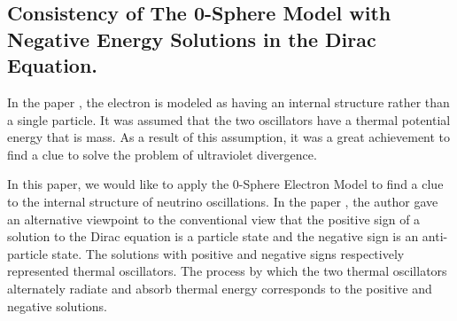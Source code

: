 \documentclass[%
 reprint,
 amsmath,amssymb,
 aps,
]{revtex4-1}
\numberwithin{equation}{section}%
\begin{document}
\subsection{Consistency of The 0-Sphere Model with Negative Energy Solutions in the Dirac Equation.}


In the paper \cite{Hanamura1}, the electron is modeled as having an internal structure rather than a single particle. It was assumed that the two oscillators have a thermal potential energy that is mass. As a result of this assumption, it was a great achievement to find a clue to solve the problem of ultraviolet divergence.

In this paper, we would like to apply the 0-Sphere Electron Model to find a clue to the internal structure of neutrino oscillations. In the paper \cite{Hanamura6}, the author gave an alternative viewpoint to the conventional view that the positive sign of a solution to the Dirac equation is a particle state and the negative sign is an anti-particle state. The solutions with positive and negative signs respectively represented thermal oscillators. The process by which the two thermal oscillators alternately radiate and absorb thermal energy corresponds to the positive and negative solutions.


\end{document}
